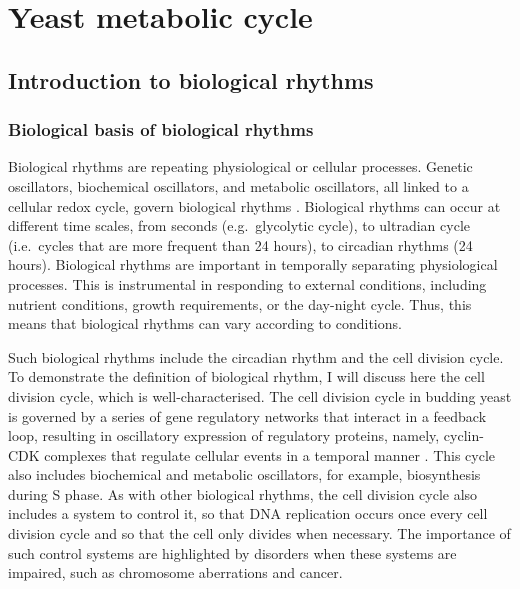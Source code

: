 \section{Yeast metabolic cycle}
\label{sec:intro-ymc}

\subsection{Introduction to biological rhythms}
\label{subsec:intro-ymc-biological_rhythms}

\subsubsection{Biological basis of biological rhythms}
\label{subsubsec:intro-ymc-biological_rhythms-biological_basis}


Biological rhythms are repeating physiological or cellular processes.
Genetic oscillators, biochemical oscillators, and metabolic oscillators, all linked to a cellular redox cycle, govern biological rhythms \citep{mellorMolecularBasisMetabolic2016}.
Biological rhythms can occur at different time scales, from seconds (e.g.\ glycolytic cycle), to ultradian cycle (i.e.\ cycles that are more frequent than 24 hours), to circadian rhythms (24 hours).
Biological rhythms are important in temporally separating physiological processes.
This is instrumental in responding to external conditions, including nutrient conditions, growth requirements, or the day-night cycle.
Thus, this means that biological rhythms can vary according to conditions.

Such biological rhythms include the circadian rhythm and the cell division cycle.
To demonstrate the definition of biological rhythm, I will discuss here the cell division cycle, which is well-characterised.
The cell division cycle in budding yeast is governed by a series of gene regulatory networks that interact in a feedback loop, resulting in oscillatory expression of regulatory proteins, namely, cyclin-CDK complexes that regulate cellular events in a temporal manner \citep{adlerYeastCellCycle2022, orlandoGlobalControlCellcycle2008, murrayRecyclingCellCycle2004}.
This cycle also includes biochemical and metabolic oscillators, for example, biosynthesis during S phase.
As with other biological rhythms, the cell division cycle also includes a system to control it, so that DNA replication occurs once every cell division cycle and so that the cell only divides when necessary.
The importance of such control systems are highlighted by disorders when these systems are impaired, such as chromosome aberrations and cancer.


